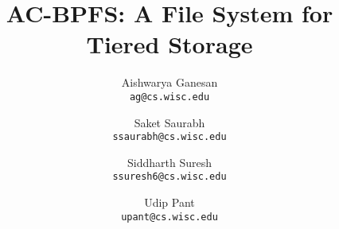 \title{
     AC-BPFS: A File System for Tiered Storage
    }

\linespread{1.2}

\author{
Aishwarya Ganesan\\
\texttt{ag@cs.wisc.edu}
\and
Saket Saurabh\\
\texttt{ssaurabh@cs.wisc.edu}
\and
Siddharth Suresh\\
\texttt{ssuresh6@cs.wisc.edu}
\and
Udip Pant\\
\texttt{upant@cs.wisc.edu}
}

\date{\vspace{-0.2in}}
\maketitle
